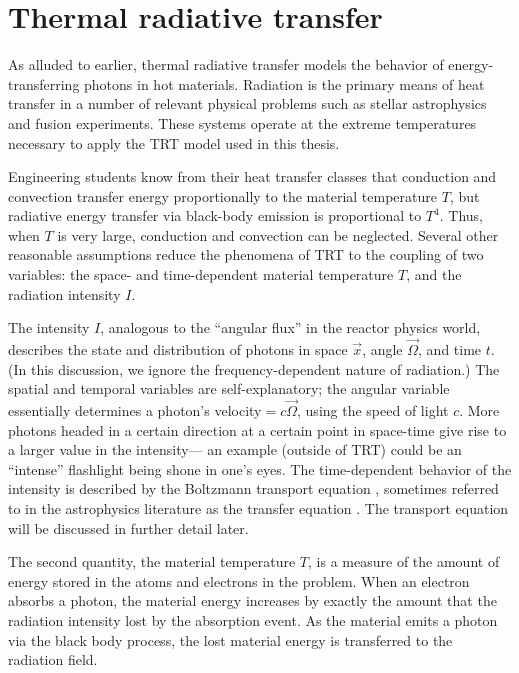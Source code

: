 \section{Thermal radiative transfer}

As alluded to earlier, thermal radiative transfer models the behavior of
energy-transferring photons in hot materials. Radiation is the primary means of
heat transfer in a number of relevant physical problems such as stellar
astrophysics and fusion experiments. These systems operate at the extreme
temperatures necessary to apply the TRT model used in this thesis.

Engineering students know from their heat transfer classes that conduction and
convection transfer energy proportionally to the material
temperature $T$, but radiative energy transfer via black-body emission is
proportional to $T^4$. Thus, when $T$ is very large, conduction and convection
can be neglected. Several other reasonable assumptions reduce the phenomena of
TRT to the coupling of two variables: the space- and time-dependent material
temperature $T$, and the radiation intensity $I$.

The intensity $I$, analogous to the ``angular flux'' in the reactor physics
world,
describes the state and distribution of photons in space $\vec{x}$, angle
$\vec{\Omega}$, and time $t$.
(In this discussion, we ignore the frequency-dependent nature of radiation.)
The spatial and temporal variables are self-explanatory; the angular
variable essentially determines a photon's velocity${}=c\vec{\Omega}$, using
the speed of light $c$. More photons headed in a certain direction at a certain
point in space-time give rise to a larger value in the intensity---%
an example (outside of TRT) could be an ``intense'' flashlight being shone in
one's eyes.  The time-dependent behavior of the intensity is described by the
Boltzmann transport equation \cite{Dud1976}, sometimes referred to in the
astrophysics literature as the transfer equation \cite{Mih1984}.
The transport equation will be discussed in further detail later.

The second quantity, the material temperature $T$, is a measure of the amount
of energy stored in the atoms and electrons in the problem. When an electron
absorbs a photon, the material energy increases by exactly the amount that the
radiation intensity lost by the absorption event. As the material emits a
photon via the black body process, the lost material energy is transferred to
the radiation field.

